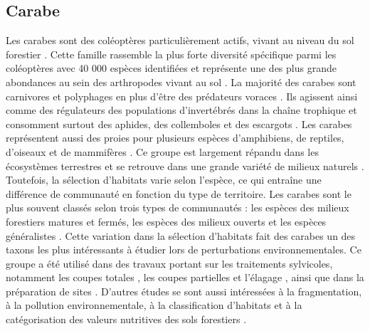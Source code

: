 \subsection*{Carabe}

Les carabes sont des coléoptères particulièrement actifs, vivant au niveau du sol forestier \citep{loveiEcologyBehaviorGround1996,Rochefort2006GroundBeetle}.
Cette famille rassemble la plus forte diversité spécifique parmi les coléoptères avec 40 000 espèces identifiées \citep{Erwin1985taxonpulse} 
et représente une des plus grande abondances au sein des arthropodes vivant au sol \citep{loveiEcologyBehaviorGround1996,Rochefort2006GroundBeetle}.
La majorité des carabes sont carnivores et polyphages en plus d’être des prédateurs voraces \citep{loveiEcologyBehaviorGround1996}. 
Ils agissent ainsi comme des régulateurs des populations d’invertébrés dans la chaîne trophique et consomment surtout des aphides, des collemboles et des escargots \citep{loveiEcologyBehaviorGround1996}. 
Les carabes représentent aussi des proies pour plusieurs espèces d’amphibiens, de reptiles, d’oiseaux et de mammifères \citep{loveiEcologyBehaviorGround1996}. 
Ce groupe est largement répandu dans les écosystèmes terrestres et se retrouve dans une grande variété de milieux naturels \citep{Larochelle2003naturalhistory}. 
Toutefois, la sélection d'habitats varie selon l'espèce, ce qui entraîne une différence de communauté en fonction du type de territoire.
Les carabes sont le plus souvent classés selon trois types de communautés : les espèces des milieux forestiers matures et fermés, les espèces des milieux ouverts et les espèces généralistes \citep{Niemela2007effectsforestry}. 
Cette variation dans la sélection d'habitats fait des carabes un des taxons les plus intéressants à étudier lors de perturbations environnementales.
Ce groupe a été utilisé dans des travaux portant sur les traitements sylvicoles, notamment les coupes totales \citep{Heliola2001Distributioncarabid,koivulaBorealCarabidbeetleColeoptera2002a,Niemela1993Effectsclearcut}, 
les coupes partielles et l'élagage \citep{Lemieux2004Groundbeetle,Peck2004Longertermeffects,mooreEffectsTwoSilvicultural2004}, 
ainsi que dans la préparation de sites \citep{Duchesne*1999EffectsClearCutting}.
D'autres études se sont aussi intéressées à la fragmentation, à la pollution environnementale, à la classification d'habitats et à la catégorisation des valeurs nutritives des sols forestiers \citep{bouchardBeetleCommunityResponse2016b,Halme1993Carabidbeetles,Luff1992Classificationprediction,Niemela2001Carabidbeetles,Rainio2003Groundbeetles,Work2008Evaluationcarabid}.

